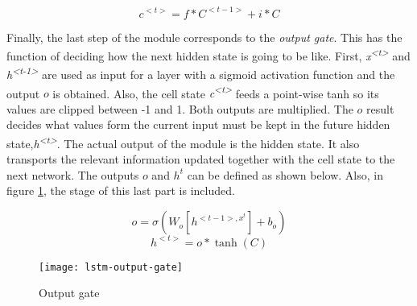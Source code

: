 	
	\[c^{<t>} = f * C^{<t-1>} + i * C\]
	
				
	Finally, the last step of the module corresponds to the \textit{output gate}. This has the function of deciding how the next hidden state is going to be like. First, \textit{x\textsuperscript{<t>}} and \textit{h\textsuperscript{<t-1>}} are used as input for a layer with a sigmoid activation function and the output $o$ is obtained. Also, the cell state \textit{c\textsuperscript{<t>}} feeds a point-wise \acrshort{tanh} so its values are clipped between -1 and 1. Both outputs are multiplied. The $o$ result decides what values form the current input must be kept in the future hidden state,\textit{h\textsuperscript{<t>}}. The actual output of the module is the hidden state. It also transports the relevant information updated together with the cell state to the next network. The outputs $o$ and $h^{t}$ can be defined as shown below. Also, in figure \ref{fig:mesh45}, the stage of this last part is included.
		
	\begin{figure}[H]
		\ContinuedFloat*
		\[ o = \sigma(W_{o}[h^{<t-1>, x^{t}}] + b_{o}) \]
		\[ h^{<t>} = o * \tanh(C) \]
	\end{figure}

	\begin{figure}[H]
		\centering
		\captionsetup{justification=centering}
		\texttt{[image: lstm-output-gate]}
		\caption{Output gate}
		\label{fig:mesh45}
	\end{figure}

	
	
	
	